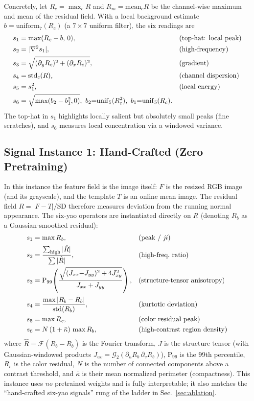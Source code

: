 \documentclass[preprint,12pt]{elsarticle}
\begin{document}
Concretely, let $R_c=\max_c R$ and $R_m=\mathrm{mean}_c R$ be the channel-wise
maximum and mean of the residual field. With a local background estimate
$b=\mathrm{uniform}_7(R_c)$ (a $7{\times}7$ uniform filter), the six readings
are
\begin{align}
s_1 &= \max(R_c-b,\,0), && \text{(top-hat: local peak)}\\
s_2 &= |\nabla^2 s_1|, && \text{(high-frequency)}\notag\\
s_3 &= \sqrt{(\partial_y R_c)^2+(\partial_x R_c)^2}, && \text{(gradient)}\notag\\
s_4 &= \mathrm{std}_c(R), && \text{(channel dispersion)}\notag\\
s_5 &= s_1^2, && \text{(local energy)}\notag\\
s_6 &= \sqrt{\max(b_2-b_1^2,0)},\ b_2{=}\mathrm{unif}_5(R_c^2),\ b_1{=}\mathrm{unif}_5(R_c). \notag
\end{align}
The top-hat in $s_1$ highlights locally salient but absolutely small peaks
(fine scratches), and $s_6$ measures local concentration via a windowed
variance.

\subsection{Signal Instance 1: Hand-Crafted (Zero Pretraining)}
In this instance the feature field is the image itself: $F$ is the resized
RGB image (and its grayscale), and the template $T$ is an online mean
image. The residual field $R=|F-T|/\mathrm{SD}$ therefore measures
deviation from the running normal appearance. The six-yao operators are
instantiated directly on $R$ (denoting $R_b$ as a Gaussian-smoothed
residual):
\begin{align}
s_1 &= \max R_b, && \text{(peak / \emph{ji})}\\
s_2 &= \frac{\sum_{\text{high}}|\hat R|}{\sum|\hat R|}, &&
        \text{(high-freq.~{}ratio)}\\
s_3 &= \mathrm{P}_{99}\!\left(\frac{\sqrt{(J_{xx}{-}J_{yy})^2+4J_{xy}^2}}{J_{xx}+J_{yy}}\right), &&
        \text{(structure-tensor anisotropy)}\notag\\
s_4 &= \frac{\max|R_b-\bar R_b|}{\mathrm{std}(R_b)}, && \text{(kurtotic deviation)}\notag\\
s_5 &= \max R_c, && \text{(color residual peak)}\notag\\
s_6 &= N\,(1+\bar\kappa)\,\max R_b, && \text{(high-contrast region density)}\notag
\end{align}
where $\hat R=\mathcal{F}(R_b-\bar R_b)$ is the Fourier transform, $J$ is
the structure tensor (with Gaussian-windowed products $J_{uv}=\mathcal{G}_2(\partial_u R_b\,\partial_v R_b)$), $\mathrm{P}_{99}$ is the 99th
percentile, $R_c$ is the color residual, $N$ is the number of connected
components above a contrast threshold, and $\bar\kappa$ is their mean
normalized perimeter (compactness). This instance uses \emph{no}
pretrained weights and is fully interpretable; it also matches the
``hand-crafted six-yao signals'' rung of the ladder in
Sec.~\ref{sec:ablation}.
\end{document}
